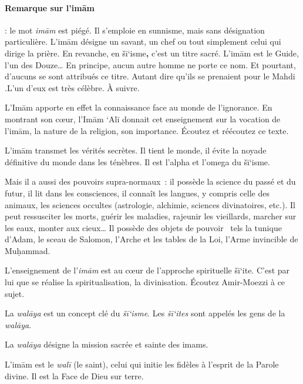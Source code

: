 \paragraph{Remarque sur l'imām~}: le mot \emph{imām}
est piégé. Il s'emploie en sunnisme, mais sans désignation particulière.
L'imām désigne un savant, un chef ou tout simplement celui qui dirige la
prière. En revanche, en šī`isme\textbf{,} c'est un titre sacré. L'imām
est le Guide, l'un des Douze\ldots{} En principe, aucun autre homme ne
porte ce nom. Et pourtant, d'aucuns se sont attribués ce titre. Autant
dire qu'ils se prenaient pour le Mahdi .L'un d'eux est très célèbre. À
suivre.

L'Imām apporte en effet la connaissance face au monde de l'ignorance. En
montrant son cœur, l'Imām `Alī donnait cet enseignement sur la vocation
de l'imām, la nature de la religion, son importance. Écoutez et
réécoutez ce texte.


L'imām transmet les vérités secrètes. Il tient le monde, il évite la
noyade définitive du monde dans les ténèbres. Il est l'alpha et l'omega
du šī`isme.

Mais il a aussi des pouvoirs supra-normaux~: il possède la science du
passé et du futur, il lit dans les consciences, il connaît les langues,
y compris celle des animaux, les sciences occultes (astrologie,
alchimie, sciences divinatoires, etc.). Il peut ressusciter les morts,
guérir les maladies, rajeunir les vieillards, marcher sur les eaux,
monter aux cieux\ldots{} Il possède des objets de pouvoir~ tels la
tunique d'Adam, le sceau de Salomon, l'Arche et les tables de la Loi,
l'Arme invincible de Muḥammad.

L'enseignement de l'\emph{imām} est au cœur de l'approche spirituelle
šī`ite. C'est par lui que se réalise la spiritualisation, la
divinisation. Écoutez Amir-Moezzi à ce sujet.



La \emph{walāya} est un concept clé du \emph{šī`isme}. Les
\emph{šī`ites} sont appelés les gens de la \emph{walāya}.\\
\begin{Def}[walāya]
La \emph{walāya} désigne la mission sacrée et sainte des imams.

L'imām est le \emph{walī} (le saint), celui qui initie les fidèles à
l'esprit de la Parole divine. Il est la Face de Dieu sur terre.

\end{Def}



